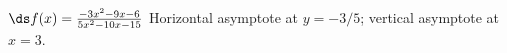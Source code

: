 {$\ds f(x)=\frac{-3 x^2-9 x-6}{5 x^2-10 x-15}$
}
{Horizontal asymptote at $y=-3/5$; vertical asymptote at $x=3$.
}
